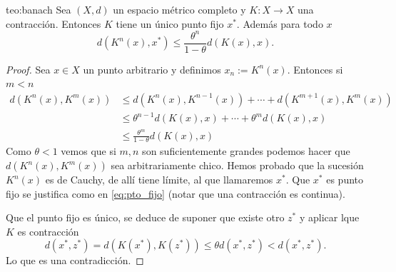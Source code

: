 \begin{teorema}{teo:banach}  Sea $(X,d)$ un espacio métrico completo y $K:X\to X$  una contracción. Entonces $K$ tiene un único punto fijo $x^*$. Además para todo $x$
\[d(K^n(x),x^*)\leq \frac{\theta^n}{1-\theta}d(K(x),x).\]
\end{teorema}
\begin{proof} Sea $x\in X$ un punto arbitrario y definimos $x_n:=K^n(x)$. Entonces si $m<n$
\[
\begin{split}
 d(K^n(x),K^m(x))&\leq d(K^n(x),K^{n-1}(x))+\cdots+ d(K^{m+1}(x),K^m(x))\\
 &\leq \theta^{n-1} d(K(x),x)+\cdots + \theta^m d(K(x),x)\\
 &\leq \frac{\theta^m}{1-\theta}d(K(x),x)
 \end{split}
\]
Como $\theta<1$ vemos que si $m,n$ son suficientemente grandes podemos hacer que $ d(K^n(x),K^m(x))$ sea arbitrariamente chico. Hemos probado que la sucesión $K^n(x)$ es de Cauchy, de allí tiene límite, al que llamaremos $x^*$. Que $x^*$ es punto fijo se justifica como en \eqref{eq:pto_fijo} (notar que una contracción es continua).

Que el punto fijo es único, se deduce de suponer que existe otro $z^*$ y aplicar lque $K$ es contracción
\[d(x^* , z^*)=d(K(x^*) , K(z^*))\leq \theta d(x^* , z^*)<d(x^* , z^*).\]
Lo que es una contradicción.
\end{proof}

